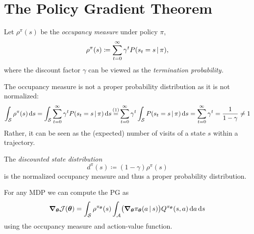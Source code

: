 	\section{The Policy Gradient Theorem}
		\begin{definition}
			Let \( \rho^\pi(s) \) be the \emph{occupancy measure} under policy \(\pi\),
			\begin{equation}
				\rho^\pi(s) \coloneqq \sum_{t = 0}^{\infty} \gamma^t P(s_t = s \,\vert\, \pi),
			\end{equation}
			where the discount factor \(\gamma\) can be viewed as the \emph{termination probability.}
		\end{definition}
		\begin{remark}
			The occupancy measure is not a proper probability distribution as it is not normalized:
			\begin{equation}
				\int_\mathcal{S} \rho^\pi(s) \dd{s}
					= \int_\mathcal{S} \sum_{t = 0}^{\infty} \gamma^t P(s_t = s \given \pi) \dd{s}
					\oversetfootnotemark{=} \sum_{t = 0}^{\infty} \gamma^t \int_\mathcal{S} P(s_t = s \given \pi) \dd{s}
					= \sum_{t = 0}^{\infty} \gamma^t
					= \frac{1}{1 - \gamma}
					\neq 1
			\end{equation}
			Rather, it can be seen as the (expected) number of visits of a state \(s\) within a trajectory.
		\end{remark}
		\begin{definition}  \label{def:discountedStateDistrib}
			The \emph{discounted state distribution}
			\begin{equation}
				d^\pi(s) \coloneqq (1 - \gamma) \rho^\pi(s)
			\end{equation}
			is the normalized occupancy measure and thus a proper probability distribution.
		\end{definition}
		\begin{theorem}  \label{th:pgt}
			For any \ac{MDP} we can compute the \ac{PG} as
			\begin{equation}
				\grad_{\bm{\theta}} \mathcal{J}(\bm{\theta}) = \int_\mathcal{S} \rho^{\pi_{\bm{\theta}}}(s) \int_\mathcal{A} \bigl( \grad_{\bm{\theta}} \pi_{\bm{\theta}}(a \,\vert\, s) \bigr) Q^{\pi_{\bm{\theta}}}(s, a) \dd{a} \dd{s}
			\end{equation}
			using the occupancy measure and action-value function.
		\end{theorem}
